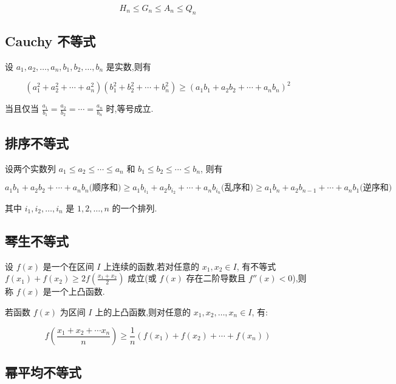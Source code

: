 \documentclass[a4paper , final]{ctexart}
\begin{document}
\begin{equation*}
  H_n \leq G_n \leq A_n \leq Q_n
\end{equation*}

\subsection*{Cauchy 不等式}

设 $a_1,a_2,\ldots,a_n,b_1,b_2,\ldots,b_n$ 是实数,则有

\begin{equation*}
  (a_1^2+a_2^2+\cdots+a_n^2)(b_1^2+b_2^2+\cdots+b_n^2) \geq (a_1b_1+a_2b_2+\cdots+a_nb_n)^2
\end{equation*}

当且仅当 $\frac{a_1}{b_1}=\frac{a_2}{b_2}=\cdots=\frac{a_n}{b_n}$ 时,等号成立.

\subsection*{排序不等式}

设两个实数列 $a_1 \leq a_2 \leq \cdots \leq a_n$ 和 $b_1 \leq b_2 \leq \cdots \leq b_n$, 则有

\begin{equation*}
  a_1b_1 + a_2b_2 + \cdots + a_nb_n\text{(顺序和)} \geq a_1b_{i_1} + a_2b_{i_2} + \cdots + a_nb_{i_n}\text{(乱序和)} \geq a_1b_n + a_2b_{n-1} + \cdots + a_nb_1\text{(逆序和)}
\end{equation*}

其中 $i_1,i_2,\ldots,i_n$ 是 $1,2,\ldots,n$ 的一个排列.

\subsection*{琴生不等式}

设 $f(x)$ 是一个在区间 $I$ 上连续的函数,若对任意的 $x_1,x_2\in I$, 有不等式 $f(x_1) + f(x_2) \geq 2f\left(\frac{x_1+x_2}{2}\right)$ 成立(或 $f(x)$ 存在二阶导数且 $f''(x)<0$),则称 $f(x)$ 是一个上凸函数.

若函数 $f(x)$ 为区间 $I$ 上的上凸函数,则对任意的 $x_1,x_2,\ldots,x_n\in I$, 有:

\begin{equation*}
  f(\frac{x_1+x_2+\cdots x_n}{n})\geq \frac{1}{n}(f(x_1)+f(x_2)+\cdots+f(x_n))
\end{equation*}

\subsection*{幂平均不等式}
\end{document}

